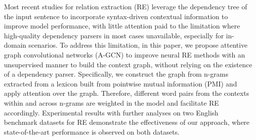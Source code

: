 Most recent studies for relation extraction (RE) leverage the dependency tree of the input sentence to incorporate syntax-driven contextual information to improve model performance, with little attention paid to the limitation where high-quality dependency parsers in most cases unavailable, especially for in-domain scenarios. To address this limitation, in this paper, we propose attentive graph convolutional networks (A-GCN) to improve neural RE methods with an unsupervised manner to build the context graph, without relying on the existence of a dependency parser. Specifically, we construct the graph from n-grams extracted from a lexicon built from pointwise mutual information (PMI) and apply attention over the graph. Therefore, different word pairs from the contexts within and across n-grams are weighted in the model and facilitate RE accordingly. Experimental results with further analyses on two English benchmark datasets for RE demonstrate the effectiveness of our approach, where state-of-the-art performance is observed on both datasets.
